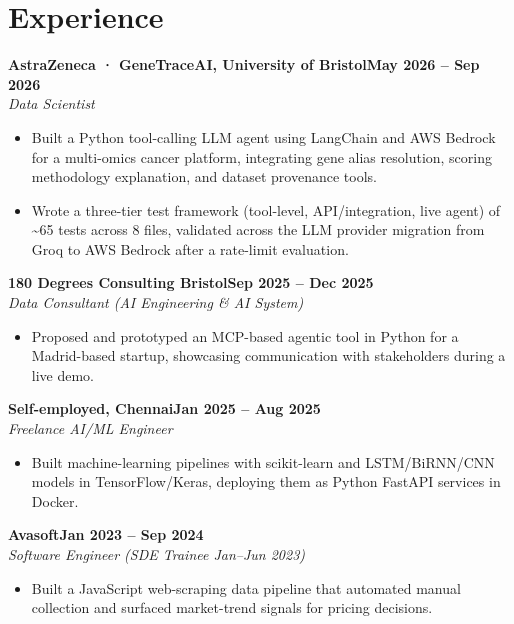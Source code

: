 \documentclass[a4paper,10pt]{article}
\newcommand{\entry}[4]{\noindent\textbf{#1}\hfill\textbf{#2}\\ \textit{#3}\hfill\textit{#4}\par}
\begin{document}
\section{Experience}
\entry{AstraZeneca · GeneTraceAI, University of Bristol}{May 2026 – Sep 2026}{Data Scientist}{}
\begin{itemize}
  \item Built a Python tool-calling LLM agent using LangChain and AWS Bedrock for a multi-omics cancer platform, integrating gene alias resolution, scoring methodology explanation, and dataset provenance tools.
  \item Wrote a three-tier test framework (tool-level, API/integration, live agent) of \textasciitilde{}65 tests across 8 files, validated across the LLM provider migration from Groq to AWS Bedrock after a rate-limit evaluation.
\end{itemize}
\vspace{3pt}
\entry{180 Degrees Consulting Bristol}{Sep 2025 – Dec 2025}{Data Consultant (AI Engineering \& AI System)}{}
\begin{itemize}
  \item Proposed and prototyped an MCP-based agentic tool in Python for a Madrid-based startup, showcasing communication with stakeholders during a live demo.
\end{itemize}
\vspace{3pt}
\entry{Self-employed, Chennai}{Jan 2025 – Aug 2025}{Freelance AI/ML Engineer}{}
\begin{itemize}
  \item Built machine-learning pipelines with scikit-learn and LSTM/BiRNN/CNN models in TensorFlow/Keras, deploying them as Python FastAPI services in Docker.
\end{itemize}
\vspace{3pt}
\entry{Avasoft}{Jan 2023 – Sep 2024}{Software Engineer (SDE Trainee Jan–Jun 2023)}{}
\begin{itemize}
  \item Built a JavaScript web-scraping data pipeline that automated manual collection and surfaced market-trend signals for pricing decisions.
\end{itemize}

\end{document}
